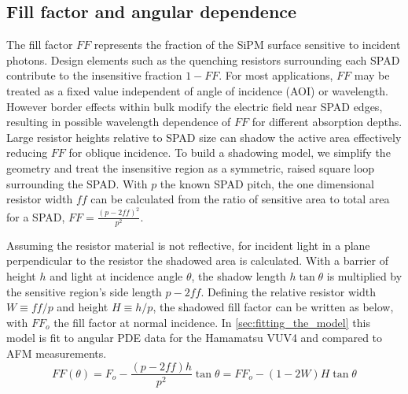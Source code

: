 \subsection{Fill factor and angular dependence}
\label{sec:ffTheta}
The fill factor $FF$ represents the fraction of the SiPM surface sensitive to incident photons. Design elements such as the quenching resistors surrounding each SPAD contribute to the insensitive fraction $1-FF$. For most applications, $FF$ may be treated as a fixed value independent of angle of incidence (AOI) or wavelength. However border effects within bulk modify the electric field near SPAD edges, resulting in possible wavelength dependence of $FF$ \cite{ACERBI2018_FF} for different absorption depths. Large resistor heights relative to SPAD size can shadow the active area effectively reducing $FF$ for oblique incidence. To build a shadowing model, we simplify the geometry and treat the insensitive region as a symmetric, raised square loop surrounding the SPAD. With $p$ the known SPAD pitch, the one dimensional resistor width $ff$ can be calculated from the ratio of sensitive area to total area for a SPAD, $FF = \frac{(p-2ff)^2}{p^2}$. 

Assuming the resistor material is not reflective, for incident light in a plane perpendicular to the resistor the shadowed area is calculated. With a barrier of height $h$ and light at incidence angle $\theta$, the shadow length $h\tan\theta$ is multiplied by the sensitive region's side length $p-2ff$. Defining the relative resistor width $W\equiv ff/p$ and height $H\equiv h/p$, the shadowed fill factor can be written as below, with $FF_o$ the fill factor at normal incidence. In \autoref{sec:fitting_the_model} this model is fit to angular PDE data for the Hamamatsu VUV4 and compared to AFM measurements.
\begin{equation}
    FF(\theta) = F_o - \frac{(p-2ff)h}{p^2}\tan\theta = FF_o - (1-2W)H\tan\theta
    \label{eq-FFtheta}
\end{equation}

